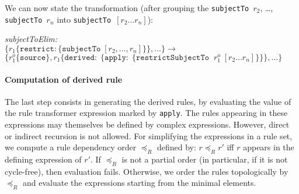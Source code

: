 We can now state the transformation (after grouping the
\texttt{subjectTo $r_2$}, \dots, \texttt{subjectTo $r_n$} into
\texttt{subjectTo $[r_2 \dots r_n]$}):


\noindent
\emph{subjectToElim:}\\
$
\{r_1 \{\mathtt{restrict}: \{\mathtt{subjectTo}\; [r_2, \dots, r_n]\}\}, \dots \} \longrightarrow$\\
$\{r_1^o \{\mathtt{source}\}, r_1 \{\mathtt{derived:}\; \{\mathtt{apply:}\; \{
\mathtt{restrictSubjectTo}\;\; r_1^o\; [r_2 \dots r_n] \}\}\}, \dots \}
$



\paragraph{\textbf{Computation of derived rule}}
The last step consists in generating the derived rules, by evaluating the
value of the rule transformer expression marked by \texttt{apply}. The rules
appearing in these expressions may themselves be defined by complex
expressions. However, direct or indirect recursion is not allowed. For
simplifying the expressions in a rule set, we compute a rule dependency order
$\preceq_R$ defined by: $r \preceq_R r'$ iff $r$ appears in the defining
expression of $r'$. If $\preceq_R$ is not a partial order (in particular, if
it is not cycle-free), then evaluation fails. Otherwise, we order the rules
topologically by $\preceq_R$ and evaluate the expressions starting from the
minimal elements.

